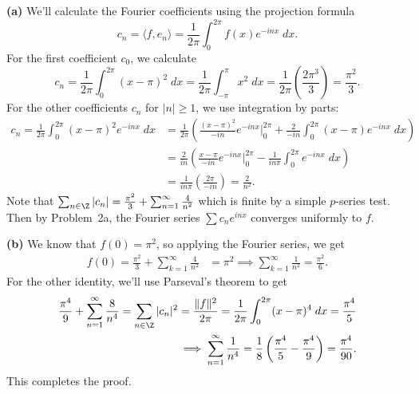 \documentclass[11pt,letterpaper]{article}
\begin{document}
\begin{solution}
    \textbf{(a)} We'll calculate the Fourier coefficients using the projection formula
    \[
        c_n = \big\langle f, e_n \big\rangle = \frac{1}{2\pi}\int^{2\pi}_0 f(x)e^{-inx}\;dx
    .\] 
    For the first coefficient $c_0$, we calculate
    \[
        c_n = \frac{1}{2\pi}\int^{2\pi}_0(x-\pi)^2\;dx=\frac{1}{2\pi}\int^\pi_{-\pi}x^2\;dx=\frac{1}{2\pi}\left(\frac{2\pi^3}{3}\right)=\frac{\pi^2}{3}
    .\] 
    For the other coefficients $c_n$ for $|n|\geq 1$, we use integration by parts:
    \[
        \begin{aligned}
            c_n=\frac{1}{2\pi}\int^{2\pi}_0(x-\pi)^2e^{-inx}\;dx&=\frac{1}{2\pi}\left(\frac{(x-\pi)^2}{-in}e^{-inx}\bigg|_0^{2\pi}+\frac{2}{-in}\int^{2\pi}_{0}(x-\pi)e^{-inx}\;dx\right)\\
            &=\frac{2}{in}\left(\frac{x-\pi}{-in}e^{-inx}\bigg|_0^{2\pi}-\frac{1}{in\pi}\int^{2\pi}_0 e^{-inx}\;dx\right)\\&=\frac{1}{in\pi}\left(\frac{2\pi}{-in}\right)=\frac{2}{n^2}.
        \end{aligned}
    \] 
    Note that $\sum_{n\in \Z}|c_n| = \frac{\pi^2}{3}+\sum^\infty_{n=1}\frac{4}{n^2}$ which is finite by a simple $p$-series test. Then by Problem~2a, the Fourier series $\sum c_n e^{inx}$ converges uniformly to $f$. 
    
    \textbf{(b)} We know that $f(0)=\pi^2$, so applying the Fourier series, we get
    \[
        \begin{aligned}
            f(0)=\frac{\pi^2}{3}+\sum^\infty_{k=1}\frac{4}{n^2}&=\pi^2 \implies
            \sum^\infty_{k=1}\frac{1}{n^2}=\frac{\pi^2}{6}.
        \end{aligned}
    \] 
    For the other identity, we'll use Parseval's theorem to get
    \[
        \begin{aligned}
        \frac{\pi^4}{9}+\sum^\infty_{n=1}\frac{8}{n^4}=\sum_{n\in \Z}|c_n|^2 = \frac{\|f\|^2}{2\pi} = \frac{1}{2\pi}\int^{2\pi}_0 (x-\pi)^4\;dx = \frac{\pi^4}{5}\\
        \implies \sum^\infty_{n=1}\frac{1}{n^4}=\frac{1}{8}\left(\frac{\pi^4}{5}-\frac{\pi^4}{9}\right) = \frac{\pi^4}{90}.
        \end{aligned}
    \] 
    This completes the proof.
\end{solution}
\end{document}
